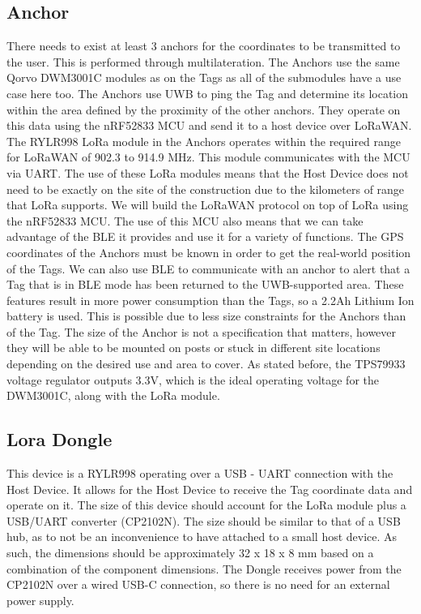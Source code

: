\documentclass[conference]{IEEEtran}
\begin{document}
\subsection{Anchor}
There needs to exist at least 3 anchors for the coordinates to be 
transmitted to the user. This is performed through multilateration. 
The Anchors use the same Qorvo DWM3001C modules as on the Tags as all 
of the submodules have a use case here too. The Anchors use UWB to ping 
the Tag and determine its location within the area defined by the 
proximity of the other anchors. They operate on this data using the 
nRF52833 MCU and send it to a host device over LoRaWAN. The RYLR998 
LoRa module in the Anchors operates within the required range for 
LoRaWAN of 902.3 to 914.9 MHz. This module communicates with the MCU 
via UART. The use of these LoRa modules means that the Host Device does 
not need to be exactly on the site of the construction due to the 
kilometers of range that LoRa supports. We will build the LoRaWAN 
protocol on top of LoRa using the nRF52833 MCU. The use of this MCU 
also means that we can take advantage of the BLE it provides and use 
it for a variety of functions. The GPS coordinates of the Anchors must 
be known in order to get the real-world position of the Tags. We can 
also use BLE to communicate with an anchor to alert that a Tag that is 
in BLE mode has been returned to the UWB-supported area. These features 
result in  more power consumption than the Tags, so a 2.2Ah Lithium Ion 
battery is used. This is possible due to less size constraints for the 
Anchors than of the Tag. The size of the Anchor is not a specification 
that matters, however they will be able to be mounted on posts or stuck 
in different site locations depending on the desired use and area to cover.
As stated before, the TPS79933 voltage regulator outputs 3.3V, which is 
the ideal operating voltage for the DWM3001C, along with the LoRa module. 


\subsection{Lora Dongle}
This device is a RYLR998 operating over a USB - UART connection with the 
Host Device. It allows for the Host Device to receive the Tag coordinate 
data and operate on it. The size of this device should account for the 
LoRa module plus a USB/UART converter (CP2102N). The size should be similar 
to that of a USB hub, as to not be an inconvenience to have attached to a 
small host device. As such, the dimensions should be approximately 32 x 18 
x 8 mm based on a combination of the component dimensions. 
The Dongle receives power from the CP2102N over a wired USB-C connection, 
so there is no need for an external power supply. 
\end{document}
